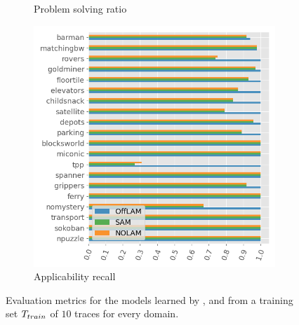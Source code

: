 \begin{figure}[ht]
\begin{subfigure}[b]{0.3\textwidth}
    \caption{Problem solving ratio}
    \label{fig:solving-ratio}
  \end{subfigure}
  \hfill
  \begin{subfigure}[b]{0.3\textwidth}
    \includegraphics[width=\textwidth]{figures/10_traces_mini/app_recall.png}
    \caption{Applicability recall}
  \end{subfigure}




  \caption{Evaluation metrics for the models learned by \samshort{}, \offlam{} and \nolam{} from a training set $T_{train}$ of $10$ traces for every domain.}
  \label{fig:exp-mini}
\end{figure} 